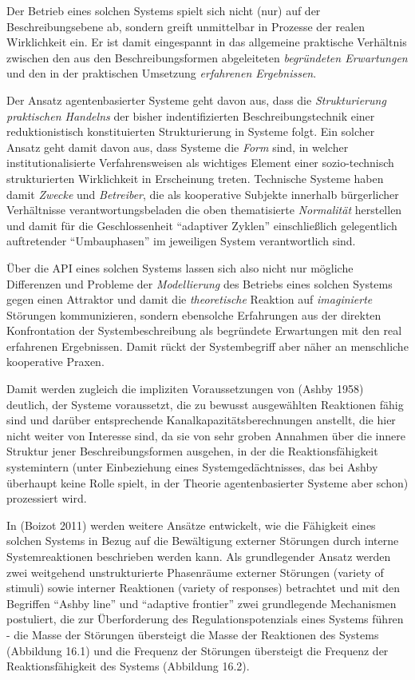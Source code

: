 \documentclass[11pt,a4paper]{article}
\begin{document}
Der Betrieb eines solchen Systems spielt sich nicht (nur) auf der
Beschreibungsebene ab, sondern greift unmittelbar in Prozesse der realen
Wirklichkeit ein. Er ist damit eingespannt in das allgemeine praktische
Verhältnis zwischen den aus den Beschreibungsformen abgeleiteten
\emph{begründeten Erwartungen} und den in der praktischen Umsetzung
\emph{erfahrenen Ergebnissen}.

Der Ansatz agentenbasierter Systeme geht davon aus, dass die
\emph{Strukturierung praktischen Handelns} der bisher indentifizierten
Beschreibungstechnik einer reduktionistisch konstituierten
Strukturierung in Systeme folgt. Ein solcher Ansatz geht damit davon
aus, dass Systeme die \emph{Form} sind, in welcher institutionalisierte
Verfahrensweisen als wichtiges Element einer sozio-technisch
strukturierten Wirklichkeit in Erscheinung treten. Technische Systeme
haben damit \emph{Zwecke} und \emph{Betreiber}, die als kooperative
Subjekte innerhalb bürgerlicher Verhältnisse verantwortungsbeladen die
oben thematisierte \emph{Normalität} herstellen und damit für die
Geschlossenheit ``adaptiver Zyklen'' einschließlich gelegentlich
auftretender ``Umbauphasen'' im jeweiligen System verantwortlich sind.

Über die API eines solchen Systems lassen sich also nicht nur mögliche
Differenzen und Probleme der \emph{Modellierung} des Betriebs eines
solchen Systems gegen einen Attraktor und damit die \emph{theoretische}
Reaktion auf \emph{imaginierte} Störungen kommunizieren, sondern
ebensolche Erfahrungen aus der direkten Konfrontation der
Systembeschreibung als begründete Erwartungen mit den real erfahrenen
Ergebnissen. Damit rückt der Systembegriff aber näher an menschliche
kooperative Praxen.

Damit werden zugleich die impliziten Voraussetzungen von (Ashby 1958)
deutlich, der Systeme voraussetzt, die zu bewusst ausgewählten
Reaktionen fähig sind und darüber entsprechende
Kanalkapazitätsberechnungen anstellt, die hier nicht weiter von
Interesse sind, da sie von sehr groben Annahmen über die innere Struktur
jener Beschreibungsformen ausgehen, in der die Reaktionsfähigkeit
systemintern (unter Einbeziehung eines Systemgedächtnisses, das bei
Ashby überhaupt keine Rolle spielt, in der Theorie agentenbasierter
Systeme aber schon) prozessiert wird.

In (Boizot 2011) werden weitere Ansätze entwickelt, wie die Fähigkeit
eines solchen Systems in Bezug auf die Bewältigung externer Störungen
durch interne Systemreaktionen beschrieben werden kann. Als
grundlegender Ansatz werden zwei weitgehend unstrukturierte Phasenräume
externer Störungen (variety of stimuli) sowie interner Reaktionen
(variety of responses) betrachtet und mit den Begriffen ``Ashby line''
und ``adaptive frontier'' zwei grundlegende Mechanismen postuliert, die
zur Überforderung des Regulationspotenzials eines Systems führen - die
Masse der Störungen übersteigt die Masse der Reaktionen des Systems
(Abbildung 16.1) und die Frequenz der Störungen übersteigt die Frequenz
der Reaktionsfähigkeit des Systems (Abbildung 16.2).
\end{document}
